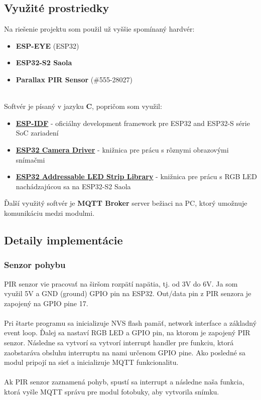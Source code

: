 \documentclass[a4paper,12pt]{article}
\begin{document}
\subsection{Využité prostriedky}
Na riešenie projektu som použil už vyššie spomínaný hardvér:
\begin{itemize}
  \item \textbf{ESP-EYE} (ESP32)
  \item \textbf{ESP32-S2 Saola}
  \item \textbf{Parallax PIR Sensor} (\#555-28027)
\end{itemize}
\\
Softvér je písaný v jazyku \textbf{C}, popričom som využil:
\begin{itemize}
  \item \textbf{\href{https://github.com/espressif/esp-idf}{\color{blue}ESP-IDF}} - oficiálny development framework pre ESP32 and ESP32-S série SoC zariadení
  \item \textbf{\href{https://github.com/espressif/esp32-camera}{\color{blue}ESP32 Camera Driver}} - knižnica pre prácu s rôznymi obrazovými snímačmi
  \item \textbf{\href{https://github.com/Lucas-Bruder/ESP32_LED_STRIP}{\color{blue}ESP32 Addressable LED Strip Library}} - knižnica pre prácu s RGB LED nachádzajúcou sa na ESP32-S2 Saola
\end{itemize}
Ďalší využitý softvér je \textbf{MQTT Broker} server bežiaci na PC, ktorý umožnuje komunikáciu medzi modulmi.

\subsection{Detaily implementácie}
\subsubsection{Senzor pohybu}
PIR senzor vie pracovať na širšom rozpätí napätia, tj. od 3V do 6V. Ja som využil 5V a GND (ground) GPIO pin na ESP32. Out/data pin z PIR senzora je zapojený na GPIO pine 17.
\\
\\
Pri štarte programu sa inicializuje NVS flash pamäť, network interface a základný event loop. Ďalej sa nastaví RGB LED a GPIO pin, na ktorom je zapojený PIR senzor.
Následne sa vytvorí sa vytvorí interrupt handler pre funkciu, ktorá zaobstaráva obsluhu interruptu
na nami určenom GPIO pine. Ako posledné sa modul pripojí na sieť a inicializuje MQTT funkcionalitu.
\\
\\
Ak PIR senzor zaznamená pohyb, spustí sa interrupt a následne naša funkcia, ktorá vyšle MQTT správu pre modul fotobuky, aby vytvorila snímku. 
\end{document}

